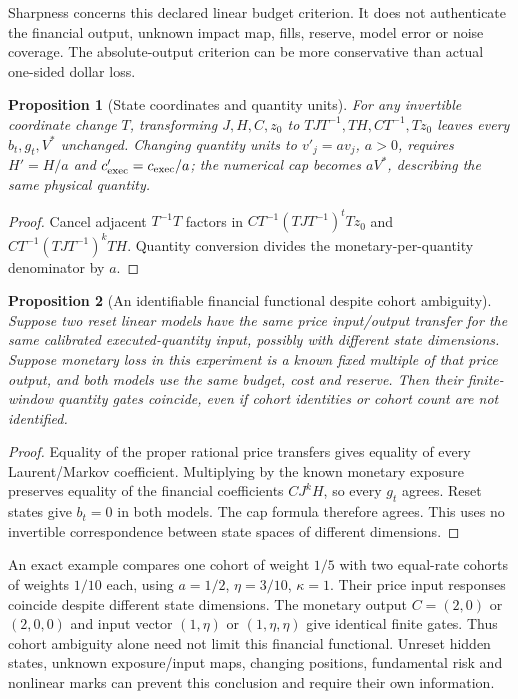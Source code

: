 \documentclass[11pt]{article}
\newtheorem{proposition}{Proposition}
\begin{document}
Sharpness concerns this declared linear budget criterion. It does not authenticate the financial output, unknown impact map, fills, reserve, model error or noise coverage. The absolute-output criterion can be more conservative than actual one-sided dollar loss.

\begin{proposition}[State coordinates and quantity units]
For any invertible coordinate change $T$, transforming $J,H,C,z_0$ to $TJT^{-1},TH,CT^{-1},Tz_0$ leaves every $b_t,g_t,V^*$ unchanged. Changing quantity units to $v'_j=av_j$, $a>0$, requires $H'=H/a$ and $c'_{\rm exec}=c_{\rm exec}/a$; the numerical cap becomes $aV^*$, describing the same physical quantity.
\end{proposition}
\begin{proof}
Cancel adjacent $T^{-1}T$ factors in $CT^{-1}(TJT^{-1})^tTz_0$ and $CT^{-1}(TJT^{-1})^kTH$. Quantity conversion divides the monetary-per-quantity denominator by $a$.
\end{proof}


\begin{proposition}[An identifiable financial functional despite cohort ambiguity]
Suppose two reset linear models have the same price input/output transfer for the same calibrated executed-quantity input, possibly with different state dimensions. Suppose monetary loss in this experiment is a known fixed multiple of that price output, and both models use the same budget, cost and reserve. Then their finite-window quantity gates coincide, even if cohort identities or cohort count are not identified.
\end{proposition}
\begin{proof}
Equality of the proper rational price transfers gives equality of every Laurent/Markov coefficient. Multiplying by the known monetary exposure preserves equality of the financial coefficients $CJ^kH$, so every $g_t$ agrees. Reset states give $b_t=0$ in both models. The cap formula therefore agrees. This uses no invertible correspondence between state spaces of different dimensions.
\end{proof}

An exact example compares one cohort of weight $1/5$ with two equal-rate cohorts of weights $1/10$ each, using $a=1/2$, $\eta=3/10$, $\kappa=1$. Their price input responses coincide despite different state dimensions. The monetary output $C=(2,0)$ or $(2,0,0)$ and input vector $(1,\eta)$ or $(1,\eta,\eta)$ give identical finite gates. Thus cohort ambiguity alone need not limit this financial functional. Unreset hidden states, unknown exposure/input maps, changing positions, fundamental risk and nonlinear marks can prevent this conclusion and require their own information.
\end{document}
